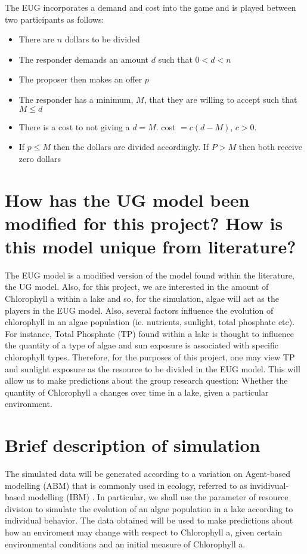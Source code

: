 \documentclass[]{article}
\begin{document}
The EUG incorporates a demand and cost into the game and is played
between two participants as follows:

\begin{itemize}
    \item There are $n$ dollars to be divided 
    \item The responder demands an amount $d$ such that $0<d<n$
    \item The proposer then makes an offer $p$
    \item The responder has a minimum, $M$, that they are willing to accept such that $M \leq d$
    \item There is a cost to not giving a $d = M$. cost $= c(d-M)$, $c>0$.
    \item If $p \leq M$ then the dollars are divided accordingly. If $P>M$ then both receive zero dollars
\end{itemize}

\section{How has the UG model been modified for this project? How is
this model unique from
literature?}\label{how-has-the-ug-model-been-modified-for-this-project-how-is-this-model-unique-from-literature}

The EUG model is a modified version of the model found within the
literature, the UG model. Also, for this project, we are interested in
the amount of Chlorophyll a within a lake and so, for the simulation,
algae will act as the players in the EUG model. Also, several factors
influence the evolution of chlorophyll in an algae population (ie.
nutrients, sunlight, total phosphate etc). For instance, Total Phosphate
(TP) found within a lake is thought to influence the quantity of a type
of algae and sun exposure is associated with specific chlorophyll types.
Therefore, for the purposes of this project, one may view TP and
sunlight exposure as the resource to be divided in the EUG model. This
will allow us to make predictions about the group research question:
Whether the quantity of Chlorophyll a changes over time in a lake, given
a particular environment.

\section{Brief description of
simulation}\label{brief-description-of-simulation}

The simulated data will be generated according to a variation on
Agent-based modelling (ABM) that is commonly used in ecology, referred
to as invidivual-based modelling (IBM) . In particular, we shall use the
parameter of resource division to simulate the evolution of an algae
population in a lake according to individual behavior. The data obtained
will be used to make predictions about how an enviroment may change with
respect to Chlorophyll a, given certain environmental conditions and an
initial measure of Chlorophyll a.
\end{document}
